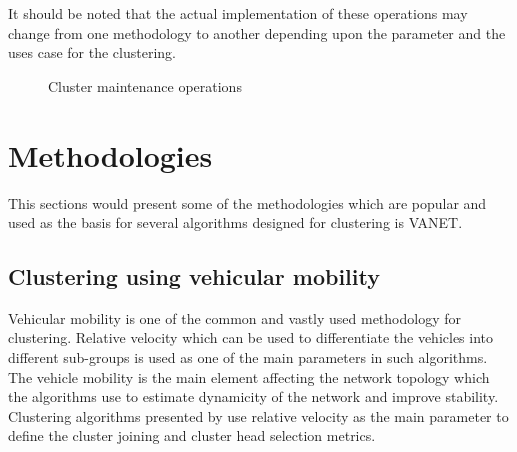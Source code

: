 \documentclass[]{ccs-thesis}
\begin{document}
It should be noted that the actual implementation of these operations may change from one methodology to another depending upon the parameter and the
uses case for the clustering.

\begin{figure}[h]
    \centering
    \vfill%

    \caption{Cluster maintenance operations}
    \label{fig:maintenance}
\end{figure}

\section{Methodologies}

This sections would present some of the methodologies which are popular and used as the basis for several algorithms designed for clustering
is \ac{VANET}.

\subsection{Clustering using vehicular mobility}

Vehicular mobility is one of the common and vastly used methodology for clustering. Relative velocity which can be used to differentiate
the vehicles into different sub-groups is used as one of the main parameters in such algorithms. The vehicle mobility is the main element
affecting the network topology which the algorithms use to estimate dynamicity of the network and improve stability. Clustering algorithms
presented by \textcite{ARKIAN2014197, 6737622, 6077004} use relative velocity as the main parameter to define the cluster joining and cluster
head selection metrics.
\end{document}
